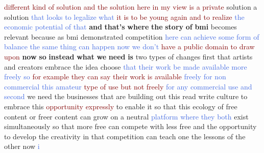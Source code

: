 \textcolor{Maroon}{different} \textcolor{Maroon}{kind} \textcolor{Maroon}{of} \textcolor{Maroon}{solution} \textcolor{Maroon}{and} \textcolor{Maroon}{the} \textcolor{Maroon}{solution} \textcolor{Maroon}{here} \textcolor{Maroon}{in} \textcolor{Maroon}{my} \textcolor{Maroon}{view} \textcolor{Maroon}{is} \textcolor{Maroon}{a} \textcolor{Maroon}{private} solution a solution \textcolor{RoyalBlue}{that} \textcolor{RoyalBlue}{looks} \textcolor{RoyalBlue}{to} \textcolor{RoyalBlue}{legalize} \textcolor{RoyalBlue}{what} \textcolor{Maroon}{it} \textcolor{Maroon}{is} \textcolor{Maroon}{to} \textcolor{Maroon}{be} \textcolor{Maroon}{young} \textcolor{Maroon}{again} \textcolor{Maroon}{and} \textcolor{Maroon}{to} \textcolor{Maroon}{realize} \textcolor{RoyalBlue}{the} \textcolor{RoyalBlue}{economic} \textcolor{RoyalBlue}{potential} \textcolor{RoyalBlue}{of} \textcolor{RoyalBlue}{that} \textbf{and} \textbf{that's} \textbf{where} \textbf{the} \textbf{story} \textbf{of} \textbf{bmi} becomes relevant because as bmi demonstrated competition \textcolor{RoyalBlue}{here} \textcolor{RoyalBlue}{can} \textcolor{RoyalBlue}{achieve} \textcolor{RoyalBlue}{some} \textcolor{RoyalBlue}{form} \textcolor{RoyalBlue}{of} \textcolor{RoyalBlue}{balance} \textcolor{RoyalBlue}{the} \textcolor{RoyalBlue}{same} \textcolor{RoyalBlue}{thing} \textcolor{RoyalBlue}{can} \textcolor{RoyalBlue}{happen} \textcolor{RoyalBlue}{now} \textcolor{RoyalBlue}{we} \textcolor{RoyalBlue}{don't} \textcolor{Maroon}{have} \textcolor{Maroon}{a} \textcolor{Maroon}{public} \textcolor{Maroon}{domain} \textcolor{Maroon}{to} \textcolor{Maroon}{draw} \textcolor{Maroon}{upon} \textbf{now} \textbf{so} \textbf{instead} \textbf{what} \textbf{we} \textbf{need} \textbf{is} two types of changes first that artists and creators embrace the idea choose \textcolor{RoyalBlue}{that} \textcolor{RoyalBlue}{their} \textcolor{RoyalBlue}{work} \textcolor{RoyalBlue}{be} \textcolor{RoyalBlue}{made} \textcolor{RoyalBlue}{available} \textcolor{RoyalBlue}{more} \textcolor{RoyalBlue}{freely} \textcolor{RoyalBlue}{so} \textcolor{Maroon}{for} \textcolor{Maroon}{example} \textcolor{Maroon}{they} \textcolor{Maroon}{can} \textcolor{Maroon}{say} \textcolor{Maroon}{their} \textcolor{Maroon}{work} \textcolor{Maroon}{is} \textcolor{Maroon}{available} \textcolor{RoyalBlue}{freely} \textcolor{RoyalBlue}{for} \textcolor{RoyalBlue}{non} \textcolor{RoyalBlue}{commercial} \textcolor{RoyalBlue}{this} \textcolor{RoyalBlue}{amateur} \textcolor{Maroon}{type} \textcolor{Maroon}{of} \textcolor{Maroon}{use} \textcolor{Maroon}{but} \textcolor{Maroon}{not} \textcolor{Maroon}{freely} \textcolor{RoyalBlue}{for} \textcolor{RoyalBlue}{any} \textcolor{RoyalBlue}{commercial} \textcolor{RoyalBlue}{use} \textcolor{RoyalBlue}{and} \textcolor{RoyalBlue}{second} we need the businesses that are building out this read write culture to embrace this \textcolor{Maroon}{opportunity} \textcolor{Maroon}{expressly} to enable it so that this ecology of free content or freer content can grow on a neutral \textcolor{RoyalBlue}{platform} \textcolor{RoyalBlue}{where} \textcolor{RoyalBlue}{they} \textcolor{RoyalBlue}{both} exist simultaneously so that more free can compete with less free and the opportunity to develop the creativity in that competition can teach one the lessons of the other now \textcolor{RoyalBlue}{i} 